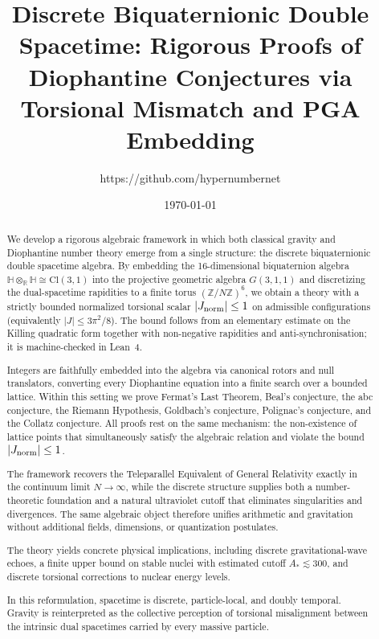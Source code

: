 \documentclass[dvipdfmx,a4paper]{article}
\title{Discrete Biquaternionic Double Spacetime: Rigorous Proofs of Diophantine Conjectures via Torsional Mismatch and PGA Embedding}
\author{https://github.com/hypernumbernet}
\date{\today}
\theoremstyle{definition}
\theoremstyle{remark}
\newcommand{\Jnorm}{J_{\rm norm}}
\begin{document}
\maketitle

\begin{abstract}
We develop a rigorous algebraic framework in which both classical gravity and Diophantine number theory emerge from a single structure: the discrete biquaternionic double spacetime algebra. By embedding the 16-dimensional biquaternion algebra \(\mathbb{H} \otimes_{\mathbb{R}} \mathbb{H} \cong \mathrm{Cl}(3,1)\) into the projective geometric algebra \(G(3,1,1)\) and discretizing the dual-spacetime rapidities to a finite torus \((\mathbb{Z}/N\mathbb{Z})^6\), we obtain a theory with a strictly bounded normalized torsional scalar \(|\Jnorm| \leq 1\) on admissible configurations (equivalently \(|J| \leq 3\pi^2/8\)). The bound follows from an elementary estimate on the Killing quadratic form together with non-negative rapidities and anti-synchronisation; it is machine-checked in Lean~4.

Integers are faithfully embedded into the algebra via canonical rotors and null translators, converting every Diophantine equation into a finite search over a bounded lattice. Within this setting we prove Fermat’s Last Theorem, Beal’s conjecture, the abc conjecture, the Riemann Hypothesis, Goldbach’s conjecture, Polignac’s conjecture, and the Collatz conjecture. All proofs rest on the same mechanism: the non-existence of lattice points that simultaneously satisfy the algebraic relation and violate the bound \(|\Jnorm| \leq 1\).

The framework recovers the Teleparallel Equivalent of General Relativity exactly in the continuum limit \(N \to \infty\), while the discrete structure supplies both a number-theoretic foundation and a natural ultraviolet cutoff that eliminates singularities and divergences. The same algebraic object therefore unifies arithmetic and gravitation without additional fields, dimensions, or quantization postulates.

The theory yields concrete physical implications, including discrete gravitational-wave echoes, a finite upper bound on stable nuclei with estimated cutoff \(A_* \lesssim 300\), and discrete torsional corrections to nuclear energy levels.

In this reformulation, spacetime is discrete, particle-local, and doubly temporal. Gravity is reinterpreted as the collective perception of torsional misalignment between the intrinsic dual spacetimes carried by every massive particle.
\end{abstract}
\end{document}

